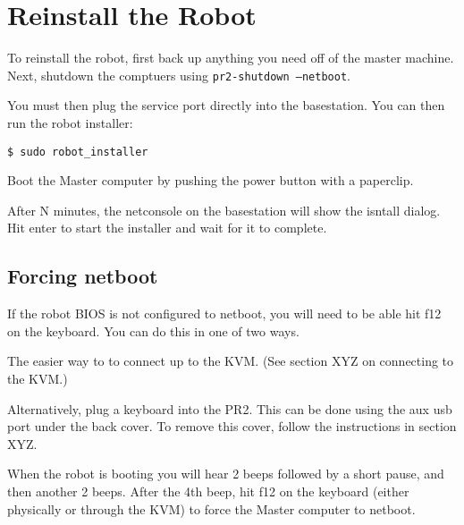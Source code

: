 \section{Reinstall the Robot}

To reinstall the robot, first back up anything you need off of the
master machine.  Next, shutdown the comptuers using
\texttt{pr2-shutdown --netboot}.

You must then plug the service port directly into the basestation.
You can then run the robot installer:

\begin{verbatim}
$ sudo robot_installer
\end{verbatim}

Boot the Master computer by pushing the power button with a paperclip.

After N minutes, the netconsole on the basestation will show the
isntall dialog.  Hit enter to start the installer and wait for it to
complete.

\subsection{Forcing netboot}

If the robot BIOS is not configured to netboot, you will need to be
able hit f12 on the keyboard.  You can do this in one of two ways.

The easier way to to connect up to the KVM.  (See section XYZ on connecting to the KVM.)

Alternatively, plug a keyboard into the PR2.  This can be done using
the aux usb port under the back cover.  To remove this cover, follow
the instructions in section XYZ.

When the robot is booting you will hear 2 beeps followed by a short
pause, and then another 2 beeps.  After the 4th beep, hit f12 on the
keyboard (either physically or through the KVM) to force the Master
computer to netboot.

